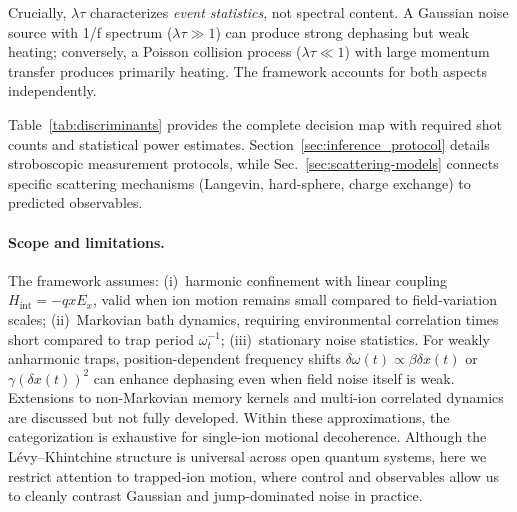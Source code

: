 Crucially, $\lambda\tau$ characterizes \emph{event statistics}, not spectral content. A Gaussian noise source with 1/f spectrum ($\lambda\tau \gg 1$) can produce strong dephasing but weak heating; conversely, a Poisson collision process ($\lambda\tau \ll 1$) with large momentum transfer produces primarily heating. The framework accounts for both aspects independently.

Table~\ref{tab:discriminants} provides the complete decision map with required shot counts and statistical power estimates. Section~\ref{sec:inference_protocol} details stroboscopic measurement protocols, while Sec.~\ref{sec:scattering-models} connects specific scattering mechanisms (Langevin, hard-sphere, charge exchange) to predicted observables.

\paragraph{Scope and limitations.}
The framework assumes: (i)~harmonic confinement with linear coupling $H_{\text{int}} = -qxE_x$, valid when ion motion remains small compared to field-variation scales; (ii)~Markovian bath dynamics, requiring environmental correlation times short compared to trap period $\omega_t^{-1}$; (iii)~stationary noise statistics. For weakly anharmonic traps, position-dependent frequency shifts $\delta\omega(t) \propto \beta \delta x(t)$ or $\gamma (\delta x(t))^2$ can enhance dephasing even when field noise itself is weak. Extensions to non-Markovian memory kernels and multi-ion correlated dynamics are discussed but not fully developed. Within these approximations, the categorization is exhaustive for single-ion motional decoherence.
Although the L\'evy--Khintchine structure is universal across open quantum systems, here we restrict attention to trapped-ion motion, where control and observables allow us to cleanly contrast Gaussian and jump-dominated noise in practice.